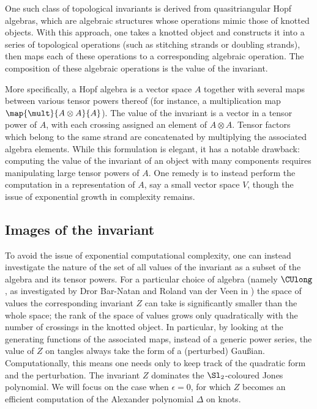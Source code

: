 One such class of topological invariants is derived from quasitriangular Hopf
algebras, which are algebraic structures whose operations mimic those of knotted
objects. With this approach, one takes a knotted object and constructs it into a
series of topological operations (such as stitching strands or doubling
strands), then maps each of these operations to a corresponding algebraic
operation. The composition of these algebraic operations is the value of the
invariant.

More specifically, a Hopf algebra is a vector space $A$ together with several
maps between various tensor powers thereof (for instance, a multiplication map
$\map {\mult} {A \otimes A} {A}$). The value of the invariant is a vector in a
tensor power of $A$, with each crossing assigned an element of $A \otimes A$.
Tensor factors which belong to the same strand are concatenated by multiplying
the associated algebra elements. While this formulation is elegant, it has a
notable drawback: computing the value of the invariant of an object with many
components requires manipulating large tensor powers of $A$. One remedy is to
instead perform the computation in a representation of $A$, say a small vector
space $V$, though the issue of exponential growth in complexity remains.

\subsection{Images of the invariant}
To avoid the issue of exponential computational complexity, one can instead
investigate the nature of the set of all values of the invariant as a subset of
the algebra and its tensor powers. For a particular choice of algebra (namely
$\CUlong$, as investigated by Dror Bar-Natan and Roland van der Veen in
\cite{BV}) the space of values the corresponding invariant $Z$ can take is
significantly smaller than the whole space; the rank of the space of values
grows only quadratically with the number of crossings in the knotted object. In
particular, by looking at the generating functions of the associated maps,
instead of a generic power series, the value of $Z$ on tangles always take the
form of a (perturbed) Gaußian. Computationally, this means one needs only to
keep track of the quadratic form and the perturbation. The invariant $Z$
dominates the $\Sl_2$-coloured Jones polynomial. We will focus on the case when
$ϵ=0$, for which $Z$ becomes an efficient computation of the Alexander
polynomial $Δ$ on knots.

